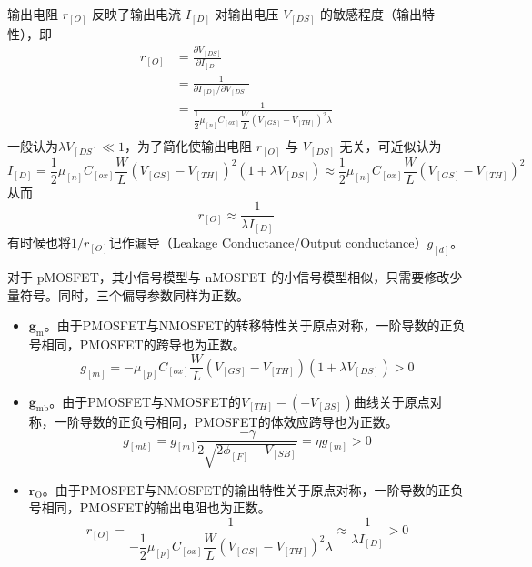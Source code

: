 输出电阻 $r_[O]$ 反映了输出电流 $I_[D]$ 对输出电压 $V_[DS]$ 的敏感程度（输出特性），即
\begin{equation}
    \begin{aligned}
        r_[O] 
        &= \frac{\partial V_[DS]}{\partial I_[D]} \\
        &= \frac{1}{\partial I_[D] / \partial V_[DS]} \\
        &= \frac{1}{\dfrac{1}{2} \mu_[n] C_[ox] \dfrac{W}{L} \left( V_[GS] - V_[TH] \right)^2 \lambda} \\
    \end{aligned}
\end{equation}
一般认为$\lambda V_[DS] \ll 1$，为了简化使输出电阻 $r_[O]$ 与 $V_[DS]$ 无关，可近似认为
\begin{equation}
    I_[D] = \dfrac{1}{2} \mu_[n] C_[ox] \dfrac{W}{L} \left( V_[GS] - V_[TH] \right)^2 \left( 1 + \lambda V_[DS] \right) \approx \dfrac{1}{2} \mu_[n] C_[ox] \dfrac{W}{L} \left( V_[GS] - V_[TH] \right)^2
\end{equation}
从而
\begin{equation}
    r_[O] \approx \frac{1}{\lambda I_[D]}
\end{equation}
有时候也将$1/r_[O]$记作漏导（Leakage Conductance/Output conductance）$g_[d]$。

对于 pMOSFET，其小信号模型与 nMOSFET 的小信号模型相似，只需要修改少量符号。同时，三个偏导参数同样为正数。
\begin{itemize}
    \item $\bm{g_{\mathrm{m}}}$。由于PMOSFET与NMOSFET的转移特性关于原点对称，一阶导数的正负号相同，PMOSFET的跨导也为正数。
        \begin{equation}
            g_[m] = -\mu_[p] C_[ox] \frac{W}{L} \left( V_[GS] - V_[TH] \right) \left( 1 + \lambda V_[DS] \right) > 0
        \end{equation}
    \item $\bm{g_{\mathrm{mb}}}$。由于PMOSFET与NMOSFET的$V_[TH] - (-V_[BS])$曲线关于原点对称，一阶导数的正负号相同，PMOSFET的体效应跨导也为正数。
        \begin{equation}
            g_[mb] = g_[m] \frac{-\gamma}{2\sqrt{2 \phi_[F] - V_[SB]}} = \eta g_[m] > 0
        \end{equation}
    \item $\bm{r_\mathrm{O}}$。由于PMOSFET与NMOSFET的输出特性关于原点对称，一阶导数的正负号相同，PMOSFET的输出电阻也为正数。
        \begin{equation}
            r_[O] = \frac{1}{-\dfrac{1}{2} \mu_[p] C_[ox] \dfrac{W}{L} \left( V_[GS] - V_[TH] \right)^2 \lambda} \approx \frac{1}{\lambda I_[D]} > 0
        \end{equation}
\end{itemize}

